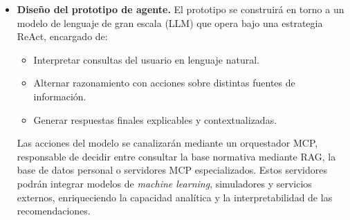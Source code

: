 \documentclass[
	spanish, %
	letterpaper, oneside
]{book}
\begin{document}
\begin{itemize}
De manera complementaria, se generarán conjuntos de datos sintéticos que simulen transacciones financieras de usuarios, con el objetivo de representar patrones realistas de ingresos, gastos, pagos y uso de productos financieros, sin recurrir a datos personales reales. Estas simulaciones permitirán:
\begin{itemize}
    \item Evaluar el comportamiento del agente frente a distintos perfiles de usuario y escenarios de uso.
    \item Probar la generación de alertas proactivas y recomendaciones personalizadas.
    \item Validar el funcionamiento del agente simulando integrar datos del sistema de finanzas abiertas en condiciones controladas y reproducibles.

    \end{itemize}
 
    A partir de la información recolectada, se desarrollará una base de datos robusta y estructurada, capaz de alimentar y validar el prototipo del agente en distintos escenarios de prueba. Esta base de datos integrará información de productos financieros y reglas de análisis que faciliten su consulta y comparación por parte del sistema conversacional.
    

Por razones de factibilidad técnica y control experimental, tanto los datos de mercado como los datos simulados serán actualizados y ajustados con una periodicidad quincenal durante esta etapa de investigación.


    \item \textbf{Diseño del prototipo de agente.}  
    El prototipo se construirá en torno a un modelo de lenguaje de gran escala (LLM) que opera bajo una estrategia ReAct, encargado de:
    \begin{itemize}
        \item Interpretar consultas del usuario en lenguaje natural.
        \item Alternar razonamiento con acciones sobre distintas fuentes de información.
        \item Generar respuestas finales explicables y contextualizadas.
    \end{itemize}
    Las acciones del modelo se canalizarán mediante un orquestador MCP, responsable de decidir entre consultar la base normativa mediante RAG, la base de datos personal o servidores MCP especializados. Estos servidores podrán integrar modelos de \emph{machine learning}, simuladores y servicios externos, enriqueciendo la capacidad analítica y la interpretabilidad de las recomendaciones.
    

\end{itemize}
\end{document}
